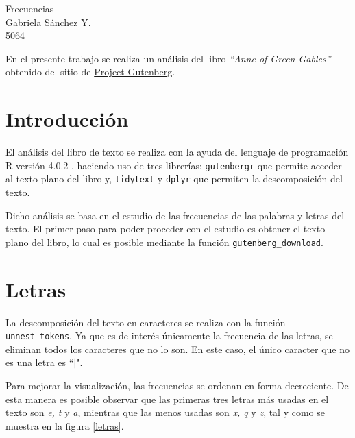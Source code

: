 \documentclass[12pt]{article}
\begin{document}
	\thispagestyle{empty}

	\begin{center}
		{\Large Frecuencias}\\ %
		Gabriela S\'anchez Y.\\
		5064
	\end{center}

	En el presente trabajo se realiza un análisis del libro \textit{``Anne of Green Gables''} obtenido del sitio de \href{http://www.gutenberg.org/}{Project Gutenberg}. 

	\section{Introducción}
	
	El análisis del libro de texto se realiza con la ayuda del lenguaje de programación \textsc{R} versión 4.0.2 \cite{r}, haciendo uso de tres librerías: \texttt{gutenbergr} que permite acceder al texto plano del libro y, \texttt{tidytext} y \texttt{dplyr} que permiten la descomposición del texto.

	Dicho análisis se basa en el estudio de las frecuencias de las palabras y letras del texto. El primer paso para poder proceder con el estudio es obtener el texto plano del libro, lo cual es posible mediante la función \texttt{gutenberg\_download}.  

	\section{Letras}
	
	La descomposición del texto en caracteres se realiza con la función \texttt{unnest\_tokens}. Ya que es de interés únicamente la frecuencia de las letras, se eliminan todos los caracteres que no lo son. En este caso, el único caracter que no es una letra es ``$\mid$". 
	
	Para mejorar la visualización, las frecuencias se ordenan en forma decreciente. De esta manera es posible observar que las primeras tres letras más usadas en el texto son \textit{e, t} y \textit{a}, mientras que las menos usadas son \textit{x, q} y \textit{z}, tal y como se muestra en la figura \ref{letras}.
	
\end{document}
